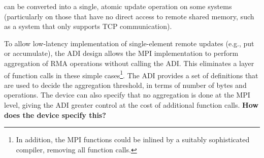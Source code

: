\noindent
can be converted into a single, atomic update operation on some
systems (particularly on those that have no direct access to remote
shared memory, such as a system that only supports TCP communication).

To allow low-latency implementation of single-element remote updates
(e.g., put or accumulate), the ADI design allows the MPI
implementation to perform aggregation of RMA operations without
calling the ADI.  This eliminates a layer of function calls in these
simple cases\footnote{In addition, the MPI functions could be inlined by a
  suitably sophisticated compiler,
removing all function calls.}.  
The ADI provides a set of definitions
that are used to decide the aggregation threshold, in terms of number
of bytes and operations.  The device can also specify that no
aggregation is done at the MPI level, giving the ADI greater control
at the cost of additional function calls.
\textbf{How does the device specify this?}
%
%

